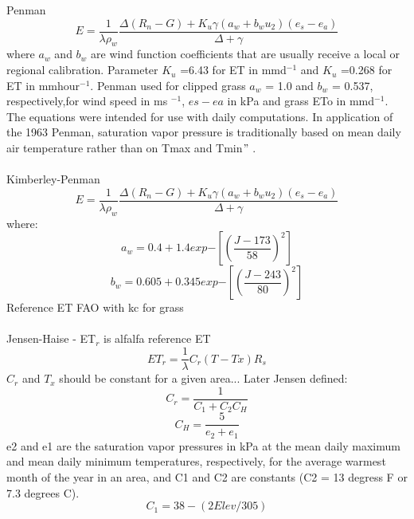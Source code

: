 \documentclass[hydrology,article,submit,moreauthors,pdftex]{Definitions/mdpi}
\begin{document}
Penman \\
\begin{equation}
E = \frac{1}{\lambda \rho_w} \frac{\Delta (R_{n}-G) + K_u \gamma(a_w+b_wu_2)(e_{s}-e_{a})}{\Delta +\gamma}
\end{equation}
where $a_w$ and $b_w$ are wind function coefficients that are usually receive a local or regional calibration.
Parameter $K_u$ =6.43 for ET in mmd$^{-1}$ and $K_u$ =0.268 for ET in mmhour$^{-1}$.
Penman \cite{penman1963vegetation} used for clipped grass \cite{asce2005asce} $a_w$ = 1.0 and $b_w$ = 0.537, respectively,for wind speed in ms $^{-1}$, $es-ea$ in kPa and grass ETo in mmd$^{-1}$. The equations were intended for use with daily computations. In application of the 1963 Penman, saturation vapor pressure is traditionally based on mean daily air temperature rather than on Tmax and Tmin$"$ \cite{jensen1990evapotranspiration}. \\
\\
Kimberley-Penman \cite{asce2005asce}
\begin{equation}
E = \frac{1}{\lambda \rho_w} \frac{\Delta (R_{n}-G) + K_u \gamma(a_w+b_wu_2)(e_{s}-e_{a})}{\Delta +\gamma} 
\end{equation}
where:
\begin{equation}
a_w = 0.4 + 1.4 exp{-\left[\left(\frac{J-173}{58}\right)^2\right]}
\end{equation}
\begin{equation}
b_w = 0.605 + 0.345 exp{-\left[\left(\frac{J-243}{80}\right)^2\right]}
\end{equation}
Reference ET FAO with kc for grass\\
\\
Jensen-Haise \cite{asce2005asce} - ET$_r$ is alfalfa reference ET
\begin{equation}
ET_r = \frac{1}{\lambda} C_r(T-Tx)R_s
\end{equation}
$C_r$ and $T_x$ should be constant for a given area...
Later Jensen defined:
\begin{equation}
C_r = \frac{1}{C_1+C_2C_H}
\end{equation}
\begin{equation}
C_H = \frac{5}{e_2 + e_1}
\end{equation}
e2 and e1 are the saturation vapor pressures in kPa at the mean daily maximum and mean daily minimum temperatures, respectively, for the average warmest month of the year in an area, and C1 and C2 are constants (C2 = 13 degress F or 7.3 degrees C).
\begin{equation}
C_1 = 38-(2Elev/305)
\end{equation}
\end{document}
